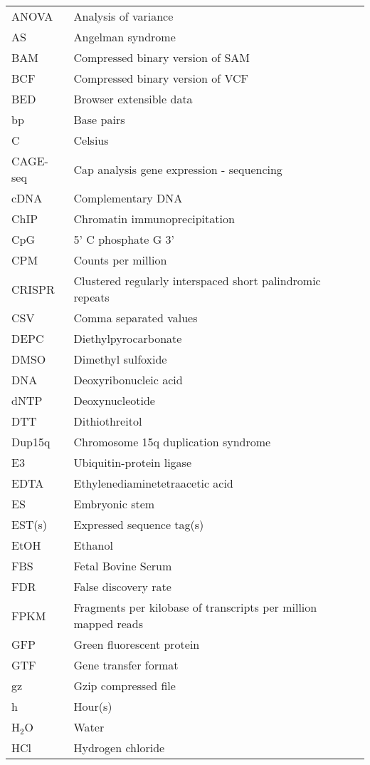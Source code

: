 \begin{longtabu}{ll}
  ANOVA  & Analysis of variance\\
  AS     & Angelman syndrome\\
  BAM    & Compressed binary version of SAM\\
  BCF    & Compressed binary version of VCF\\
  BED    & Browser extensible data\\
  bp     & Base pairs\\
  C      & Celsius\\
  CAGE-seq & Cap analysis gene expression - sequencing\\
  cDNA   & Complementary DNA\\
  ChIP   & Chromatin immunoprecipitation\\
  CpG    & 5' C phosphate G 3'\\
  CPM    & Counts per million\\
  CRISPR & Clustered regularly interspaced short palindromic repeats\\
  CSV    & Comma separated values\\
  DEPC   & Diethylpyrocarbonate\\
  DMSO   & Dimethyl sulfoxide\\
  DNA    & Deoxyribonucleic acid\\
  dNTP   & Deoxynucleotide\\
  DTT    & Dithiothreitol\\
  Dup15q & Chromosome 15q duplication syndrome\\
  E3     & Ubiquitin-protein ligase\\
  EDTA   & Ethylenediaminetetraacetic acid\\
  ES     & Embryonic stem\\
  EST(s) & Expressed sequence tag(s)\\
  EtOH   & Ethanol\\
  FBS    & Fetal Bovine Serum\\
  FDR    & False discovery rate\\
  FPKM   & Fragments per kilobase of transcripts per million mapped reads\\
  GFP    & Green fluorescent protein\\
  GTF    & Gene transfer format\\
  gz     & Gzip compressed file\\
  h      & Hour(s)\\
  H$_2$O & Water\\
  HCl    & Hydrogen chloride\\

\end{longtabu}
